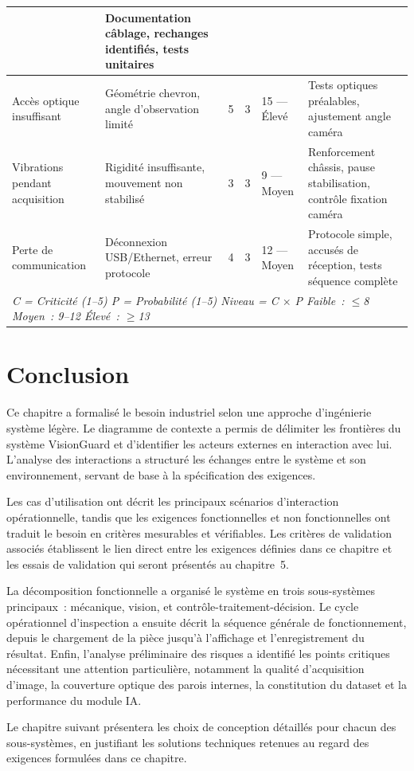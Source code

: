 \begin{longtable}{|p{3cm}|p{3cm}|c|c|p{1.9cm}|p{7.4cm}|}
    & Documentation câblage, rechanges identifiés, tests unitaires \\ \hline
Accès optique insuffisant
    & Géométrie chevron, angle d'observation limité
    & 5 & 3 & 15 — Élevé
    & Tests optiques préalables, ajustement angle caméra \\ \hline
Vibrations pendant acquisition
    & Rigidité insuffisante, mouvement non stabilisé
    & 3 & 3 & 9 — Moyen
    & Renforcement châssis, pause stabilisation, contrôle fixation caméra \\ \hline
Perte de communication
    & Déconnexion USB/Ethernet, erreur protocole
    & 4 & 3 & 12 — Moyen
    & Protocole simple, accusés de réception, tests séquence complète \\ \hline
\multicolumn{6}{|l|}{\textit{C = Criticité (1--5) \quad P = Probabilité (1--5) \quad Niveau = C $\times$ P \quad Faible~: $\leq$8 \quad Moyen~: 9--12 \quad Élevé~: $\geq$13}} \\
\hline
\end{longtable}

\section{Conclusion}

Ce chapitre a formalisé le besoin industriel selon une approche d'ingénierie système légère.
Le diagramme de contexte a permis de délimiter les frontières du système VisionGuard et
d'identifier les acteurs externes en interaction avec lui. L'analyse des interactions a
structuré les échanges entre le système et son environnement, servant de base à la
spécification des exigences.

Les cas d'utilisation ont décrit les principaux scénarios d'interaction opérationnelle,
tandis que les exigences fonctionnelles et non fonctionnelles ont traduit le besoin en
critères mesurables et vérifiables. Les critères de validation associés établissent le lien
direct entre les exigences définies dans ce chapitre et les essais de validation qui seront
présentés au chapitre~5.

La décomposition fonctionnelle a organisé le système en trois sous-systèmes principaux~:
mécanique, vision, et contrôle-traitement-décision. Le cycle opérationnel d'inspection a
ensuite décrit la séquence générale de fonctionnement, depuis le chargement de la pièce
jusqu'à l'affichage et l'enregistrement du résultat. Enfin, l'analyse préliminaire des
risques a identifié les points critiques nécessitant une attention particulière, notamment
la qualité d'acquisition d'image, la couverture optique des parois internes, la constitution
du dataset et la performance du module IA.

Le chapitre suivant présentera les choix de conception détaillés pour chacun des
sous-systèmes, en justifiant les solutions techniques retenues au regard des exigences
formulées dans ce chapitre.